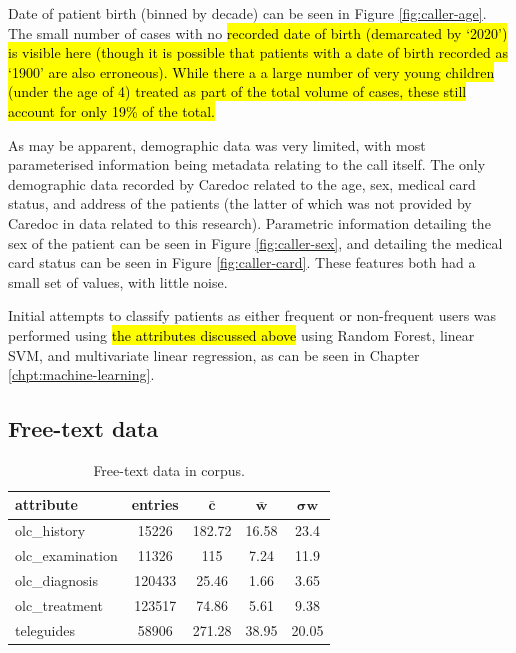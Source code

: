  
 Date of patient birth (binned by decade) can be seen in Figure \ref{fig:caller-age}. The small number of cases with no \hl{recorded date of birth (demarcated by `2020') is visible here (though it is possible that patients with a date of birth recorded as `1900' are also erroneous). While there a a large number of very young children (under the age of 4) treated as part of the total volume of cases, these still account for only 19\% of the total.}   
 

 
As may be apparent, demographic data was very limited, with most parameterised information being metadata relating to the call itself. The only demographic data recorded by Caredoc related to the age, sex, medical card status, and address of the patients (the latter of which was not provided by Caredoc in data related to this research). Parametric information detailing the sex of the patient can be seen in Figure \ref{fig:caller-sex}, and detailing the medical card status can be seen in Figure \ref{fig:caller-card}.  These features both had a small set of values, with little  noise.  
 

 
 Initial attempts to classify patients as either frequent or non-frequent users was performed using \hl{ the attributes discussed above} using Random Forest, linear SVM, and multivariate linear regression, as can be seen in Chapter \ref{chpt:machine-learning}.  
 

 
 
 
 \subsection{Free-text data}
 \label{section:free-text-description}
 
 \begin{table}[ht]
\setlength{\tabcolsep}{8pt}

\centering
\caption{Free-text data in corpus.}
\label{table:corpus}
\begin{tabular}{@{}lcccc@{}}
\toprule
\textbf{attribute} & \textbf{entries} & $\mathbf{\bar{c}}$ & $\mathbf{\bar{w}}$ &$\mathbf{\sigma w}$ \\ \midrule
olc\_history       & 15226            & 182.72                       & 16.58 & 23.4                      \\
olc\_examination   & 11326            & 115                          & 7.24  &11.9                      \\
olc\_diagnosis     & 120433           & 25.46                        & 1.66  & 3.65                      \\
olc\_treatment     & 123517           & 74.86                        & 5.61      &9.38                  \\
teleguides         & 58906            & 271.28                       & 38.95     &20.05                     \\ \bottomrule
\end{tabular}
\end{table}
 
